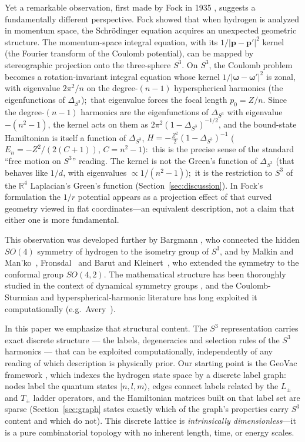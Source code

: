 \documentclass[aps,pra,twocolumn,superscriptaddress,longbibliography]{revtex4-2}
\begin{document}
Yet a remarkable observation, first made by Fock in 1935 \cite{fock1935}, suggests a fundamentally different perspective. Fock showed that when hydrogen is analyzed in momentum space, the Schr\"odinger equation acquires an unexpected geometric structure. The momentum-space integral equation, with its $1/|\mathbf{p} - \mathbf{p}'|^2$ kernel (the Fourier transform of the Coulomb potential), can be mapped by stereographic projection onto the three-sphere $S^3$. On $S^3$, the Coulomb problem becomes a rotation-invariant integral equation whose kernel $1/|\boldsymbol{\omega} - \boldsymbol{\omega}'|^2$ is zonal, with eigenvalue $2\pi^2/n$ on the degree-$(n-1)$ hyperspherical harmonics (the eigenfunctions of $\Delta_{S^3}$);\ that eigenvalue forces the focal length $p_0 = Z/n$. Since the degree-$(n-1)$ harmonics are the eigenfunctions of $\Delta_{S^3}$ with eigenvalue $-(n^2-1)$, the kernel acts on them as $2\pi^2(1-\Delta_{S^3})^{-1/2}$, and the bound-state Hamiltonian is itself a function of $\Delta_{S^3}$, $H = -\tfrac{Z^2}{2}(1-\Delta_{S^3})^{-1}$ ($E_n = -Z^2/(2(C+1))$, $C = n^2-1$):\ this is the precise sense of the standard ``free motion on $S^3$'' reading. The kernel is not the Green's function of $\Delta_{S^3}$ (that behaves like $1/d$, with eigenvalues $\propto 1/(n^2-1)$);\ it is the restriction to $S^3$ of the $\mathbb{R}^4$ Laplacian's Green's function (Section~\ref{sec:discussion}). In Fock's formulation the $1/r$ potential appears as a projection effect of that curved geometry viewed in flat coordinates---an equivalent description, not a claim that either one is more fundamental.

This observation was developed further by Bargmann \cite{bargmann1936}, who connected the hidden $SO(4)$ symmetry of hydrogen to the isometry group of $S^3$, and by Malkin and Man'ko~\cite{malkin_manko1965}, Fronsdal~\cite{fronsdal1967} and Barut and Kleinert~\cite{barut1967}, who extended the symmetry to the conformal group $SO(4,2)$. The mathematical structure has been thoroughly studied in the context of dynamical symmetry groups \cite{bander1966,biedenharn1981}, and the Coulomb-Sturmian and hyperspherical-harmonic literature has long exploited it computationally (e.g.\ Avery~\cite{avery1989}).

In this paper we emphasize that structural content. The $S^3$ representation carries exact discrete structure --- the labels, degeneracies and selection rules of the $S^3$ harmonics --- that can be exploited computationally, independently of any reading of which description is physically prior. Our starting point is the GeoVac framework \cite{loutey_paper0,loutey_paper1}, which indexes the hydrogen state space by a discrete label graph: nodes label the quantum states $|n, l, m\rangle$, edges connect labels related by the $L_\pm$ and $T_\pm$ ladder operators, and the Hamiltonian matrices built on that label set are sparse (Section~\ref{sec:graph} states exactly which of the graph's properties carry $S^3$ content and which do not). This discrete lattice is \textit{intrinsically dimensionless}---it is a pure combinatorial topology with no inherent length, time, or energy scales.
\end{document}
